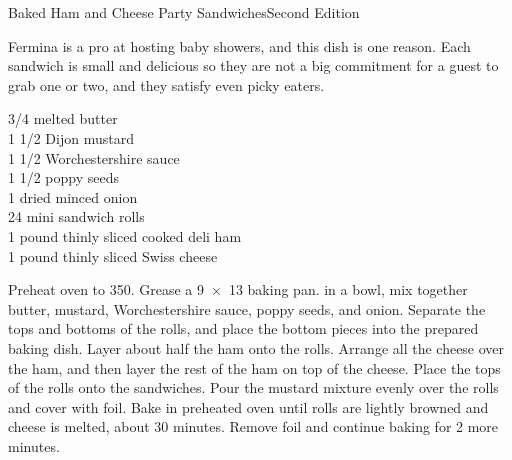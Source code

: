 \begin{entry}{Baked Ham and Cheese Party Sandwiches}{Second Edition}

\begin{open}
  Fermina is a pro at hosting baby showers, and this dish is one reason. 
  Each sandwich is small and delicious
  so they are not a big commitment for a guest to grab one or two, and they
  satisfy even picky eaters.
\end{open}
\begin{ingredients}
    \SI{3/4}{\cup} melted butter\\
    1 \SI{1/2}{\tblspoon} Dijon mustard\\
    1 \SI{1/2}{\teaspoon} Worchestershire sauce\\
    1 \SI{1/2}{\tblspoon} poppy seeds\\
    \SI{1}{\tblspoon} dried minced onion\\
    24 mini sandwich rolls\\
    1 pound thinly sliced cooked deli ham\\
    1 pound thinly sliced Swiss cheese
\end{ingredients}
Preheat oven to \SI{350}{\degreeF}. Grease a \SI{9x13}{\inch} baking pan. in a
bowl, mix together butter, mustard, Worchestershire sauce, poppy seeds, and
onion. Separate the tops and bottoms of the rolls, and place the bottom pieces
into the prepared baking dish. Layer about half the ham onto the
rolls. Arrange all the cheese over the ham, and then layer the rest of the ham
on top of the cheese. Place the tops of the rolls onto the sandwiches. Pour
the mustard mixture evenly over the rolls and cover with foil. Bake in
preheated oven until rolls are lightly browned and cheese is melted, about 30
minutes. Remove foil and continue baking for 2 more minutes.
\end{entry}

